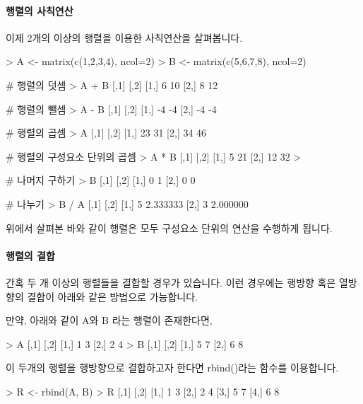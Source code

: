 \paragraph{행렬의 사칙연산} 이제 2개의 이상의 행렬을 이용한 사칙연산을 살펴봅니다.

\begin{Schunk}
\begin{Soutput}
> A <- matrix(c(1,2,3,4), ncol=2)
> B <- matrix(c(5,6,7,8), ncol=2)

# 행렬의 덧셈
> A + B 
     [,1] [,2]
[1,]    6   10
[2,]    8   12

# 행렬의 뺄셈
> A - B
     [,1] [,2]
[1,]   -4   -4
[2,]   -4   -4

# 행렬의 곱셈  
> A %*% B 
     [,1] [,2]
[1,]   23   31
[2,]   34   46

# 행렬의 구성요소 단위의 곱셈 
> A * B
     [,1] [,2]
[1,]    5   21
[2,]   12   32
> 

# 나머지 구하기
> B %% A
     [,1] [,2]
[1,]    0    1
[2,]    0    0

# 나누기 
> B / A
     [,1]     [,2]
[1,]    5 2.333333
[2,]    3 2.000000
 
\end{Soutput}
\end{Schunk}

위에서 살펴본 바와 같이 행렬은 모두 구성요소 단위의 연산을 수행하게 됩니다. 

\paragraph{행렬의 결합}  간혹 두 개 이상의 행렬들을 결합할 경우가 있습니다.
이런 경우에는 행방향 혹은 열방향의 결합이 아래와 같은 방법으로 가능합니다.

만약, 아래와 같이 A와 B 라는 행렬이 존재한다면, 

\begin{Schunk}
\begin{Soutput}
> A
     [,1] [,2]
[1,]    1    3
[2,]    2    4
> B
     [,1] [,2]
[1,]    5    7
[2,]    6    8
\end{Soutput}
\end{Schunk}

이 두개의 행렬을 행방향으로 결합하고자 한다면 rbind()라는 함수를 이용합니다.

\begin{Schunk}
\begin{Soutput}
> R <- rbind(A, B)
> R
     [,1] [,2]
[1,]    1    3
[2,]    2    4
[3,]    5    7
[4,]    6    8
\end{Soutput}
\end{Schunk}

